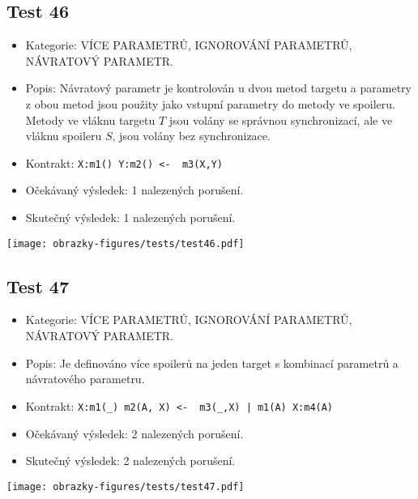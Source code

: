 \subsection*{Test 46}
\begin{itemize}
\item Kategorie: VÍCE PARAMETRŮ, IGNOROVÁNÍ PARAMETRŮ, NÁVRATOVÝ PARAMETR.
\item Popis: Návratový parametr je kontrolován u dvou metod targetu a parametry z obou metod jsou použity jako vstupní parametry do metody ve spoileru. Metody ve vláknu targetu $T$ jsou volány se správnou synchronizací, ale ve vláknu spoileru $S$, jsou volány bez synchronizace. 
\item Kontrakt: \texttt{X:m1() Y:m2() <- { m3(X,Y) }}

\item Očekávaný výsledek: 1 nalezených porušení.
\item Skutečný výsledek: 1 nalezených porušení.
\end{itemize}
\begin{center}
    \centering
    \texttt{[image: obrazky-figures/tests/test46.pdf]}
    \label{test46}
\end{center}
\subsection*{Test 47}
\begin{itemize}
\item Kategorie: VÍCE PARAMETRŮ, IGNOROVÁNÍ PARAMETRŮ, NÁVRATOVÝ PARAMETR.
\item Popis: Je definováno více spoilerů na jeden target s kombinací parametrů a návratového parametru. 
\item Kontrakt: \texttt{X:m1(_) m2(A, X) <- { m3(_,X) | m1(A) X:m4(A) }}
\item Očekávaný výsledek: 2 nalezených porušení.
\item Skutečný výsledek: 2 nalezených porušení.

\end{itemize}
\begin{center}
    \centering
    \texttt{[image: obrazky-figures/tests/test47.pdf]}
    \label{test47}
\end{center}
